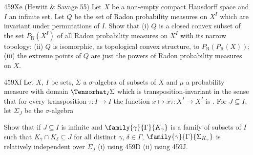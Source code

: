 {\sqheader 459Xe ({\smc Hewitt \& Savage 55}) Let $X$ be a
non-empty compact Hausdorff space and $I$
an infinite set.   Let $Q$ be the set of Radon probability measures on
$X^I$ which are invariant under permutations of $I$.   Show that (i) $Q$
is a closed convex subset of the set $P_{\text{R}}(X^I)$ of all Radon
probability measures on $X^I$ with its narrow topology;  (ii) $Q$ is
isomorphic, as topological convex structure, to
$P_{\text{R}}(P_{\text{R}}(X))$;  (iii) the
extreme points of $Q$ are just the powers of Radon probability measures
on $X$.

\spheader 459Xf Let $X$, $I$ be sets, $\Sigma$ a
$\sigma$-algebra of subsets of $X$ and $\mu$ a probability measure with
domain $\Tensorhat_I\Sigma$ which is transposition-invariant
in the sense that for every
transposition $\tau:I\to I$ the function $x\mapsto x\tau:X^I\to X^I$ is
\imp.   For $J\subseteq I$, let $\Sigma_J$ be the $\sigma$-algebra


\noindent Show that if $J\subseteq I$ is infinite and
$\family{\gamma}{\Gamma}{K_{\gamma}}$ is a family of subsets of $I$ such
that $K_{\gamma}\cap K_{\delta}\subseteq J$ for all distinct $\gamma$,
$\delta\in\Gamma$, $\family{\gamma}{\Gamma}{\Sigma_{K_{\gamma}}}$ is
relatively independent over $\Sigma_J$ (i) using 459D (ii) using 459J.


}
